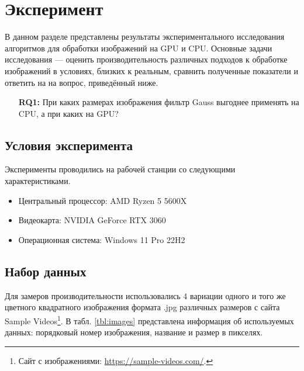
\section{Эксперимент}

В данном разделе представлены результаты экспериментального исследования алгоритмов для обработки изображений на GPU и CPU. Основные задачи исследования --- оценить производительность различных подходов к обработке изображений в условиях, близких к реальным, сравнить полученные показатели и ответить на  на вопрос, приведённый ниже.

\begin{itemize}
    \item[\textbf{RQ1:}] При каких размерах изображения фильтр Gauss выгоднее применять на CPU, а при каких на GPU?
\end{itemize}

\subsection{Условия эксперимента}

Эксперименты проводились на рабочей станции со следующими характеристиками.
\begin{itemize}
    \item Центральный процессор: AMD Ryzen 5 5600X 
    \item Видеокарта: NVIDIA GeForce RTX 3060
    \item Операционная система: Windows 11 Pro 22H2
\end{itemize}

\subsection{Набор данных}

Для замеров производительности использовались 4 вариации одного и того же цветного квадратного изображения формата .jpg различных размеров с сайта Sample Vi\-de\-os\footnote{Сайт с изображениями: \url{https://sample-videos.com/}.}. В табл. \ref{tbl:images} представлена информация об используемых данных: порядковый номер изображения, название и размер в пикселях.

\begin{table}
\centering
\caption{Параметры изображений}
\label{tbl:images}
\end{table}


